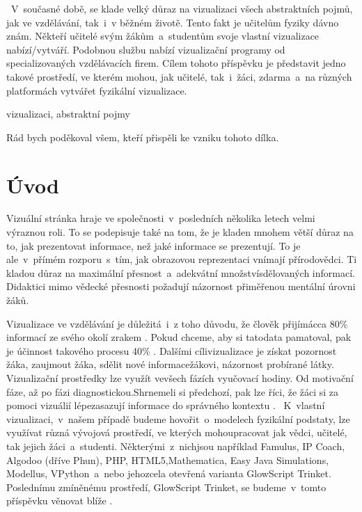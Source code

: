 \documentclass[FM,BP]{tulthesis}
\begin{document}

\begin{abstractCZ}~V~současné době, se klade velký důraz na vizualizaci všech abstraktních pojmů, jak ve vzdělávání, tak~i~v běžném životě. Tento fakt je učitelům fyziky dávno znám. Někteří učitelé svým žákům~a~studentům svoje vlastní vizualizace nabízí/vytváří. Podobnou službu nabízí vizualizační programy od specializovaných vzdělávacích firem. Cílem tohoto příspěvku je představit jedno takové prostředí, ve kterém mohou, jak učitelé, tak~i~žáci, zdarma~a~na různých platformách vytvářet fyzikální vizualizace.
\end{abstractCZ}

\begin{keywordsCZ}
vizualizaci, abstraktní pojmy
\end{keywordsCZ}

\vspace{2cm}


\clearpage

\begin{acknowledgement}
Rád bych poděkoval všem, kteří přispěli ke vzniku tohoto dílka.
\end{acknowledgement}

\tableofcontents
\listoffigures
\listoftables

\chapter{Úvod}
Vizuální stránka hraje ve společnosti~v~posledních několika letech velmi výraznou roli. To se podepisuje také na tom, že je kladen mnohem větší důraz na to, jak prezentovat informace, než jaké informace se prezentují. To je ale~v~přímém rozporu~s~tím, jak obrazovou reprezentaci vnímají přírodovědci. Ti kladou důraz na maximální přesnost~a~adekvátní množstvísdělovaných informací. Didaktici mimo vědecké přesnosti požadují názornost přiměřenou mentální úrovni žáků.

Vizualizace ve vzdělávání je důležitá~i~z toho důvodu, že člověk přijímácca 80\% informací ze svého okolí zrakem \cite{c:1}. Pokud chceme, aby si tatodata pamatoval, pak je účinnost takového procesu 40\% \cite{c:1}. Dalšími cílivizualizace je získat pozornost žáka, zaujmout žáka, sdělit nové informacežákovi, názornost probírané látky. Vizualizační prostředky lze využít vevšech fázích vyučovací hodiny. Od motivační fáze, až po fázi diagnostickou.Shrnemeli si předchozí, pak lze říci, že žáci si za pomoci vizuálií lépezasazují informace do správného kontextu \cite{c:2}.
~K~vlastní vizualizaci,~v~našem případě budeme hovořit~o~modelech fyzikální podstaty, lze využívat různá vývojová prostředí, ve kterých mohoupracovat jak vědci, učitelé, tak jejich žáci~a~studenti. Některými~z~nichjsou například Famulus, IP Coach, Algodoo (dříve Phun), PHP, HTML5,Mathematica, Easy Java Simulations, Modellus, VPython~a~nebo jehozcela otevřená varianta GlowScript Trinket. Poslednímu zmíněnému prostředí, GlowScript Trinket, se budeme~v~tomto příspěvku věnovat blíže \cite{c:3}.
\end{document}
